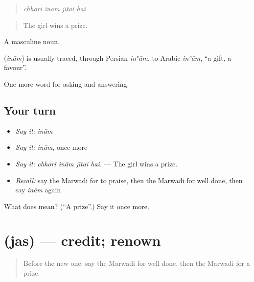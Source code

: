 \begin{quote}
   
\end{quote}

\begin{quote}
\emph{chhorī inām jītai hai.}
\end{quote}

\begin{quote}
The girl wins a prize.
\end{quote}

A masculine noun.

\begin{cousinweb}
\textbf{} (\emph{inām}) is usually traced, through Persian \emph{inʿām}, to Arabic \emph{inʿām}, \textquotedblleft{}a gift, a favour\textquotedblright{}.
\end{cousinweb}

\begin{grammarlens}[title={What you've built}]
One more word for asking and answering.
\end{grammarlens}

\subsection*{Your turn}
\begin{itemize}
\raggedright
  \item \emph{Say it:} \emph{inām}
  \item \emph{Say it:} \emph{inām}, once more
  \item \emph{Say it:} \emph{chhorī inām jītai hai.} — The girl wins a prize.
  \item \emph{Recall:} say the Marwadi for to praise, then the Marwadi for well done, then say \emph{inām} again
\end{itemize}

\begin{tcolorbox}[breakable,colback=teal!4,colframe=teal!35!black,title={Before you move on}]
What does  mean? (\textquotedblleft{}A prize\textquotedblright{}.) Say it once more.
\end{tcolorbox}
\section[\texorpdfstring{\mw{जस} (jas)}{जस (jas)}]{ (jas) — credit; renown}

\label{lesson:MW-C275-jas}



\begin{quote}
Before the new one: say the Marwadi for well done, then the Marwadi for a prize.
\end{quote}

